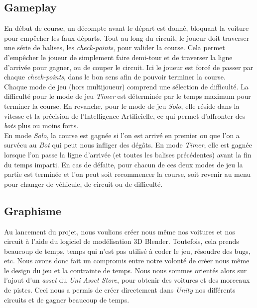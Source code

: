 \documentclass[12pt,a4paper]{article}
\newcommand{\AI}{Intelligence Artificielle}
\begin{document}
        \subsection{Gameplay}
            En début de course, un décompte avant le départ est donné, bloquant la voiture pour
            empêcher les faux départs. Tout au long du circuit, le joueur doit traverser une série de 
            balises, les \textsl{check-points}, pour valider la course. Cela permet d'empêcher le 
            joueur de simplement faire demi-tour et de traverser la ligne d'arrivée pour gagner, ou
            de couper le circuit. Ici le joueur est forcé de passer par chaque \textsl{check-points},
            dans le bon sens afin de pouvoir terminer la course.\\
            Chaque mode de jeu (hors multijoueur) comprend une sélection de difficulté.
            La difficulté pour le mode de jeu \textsl{Timer} est déterminée par le temps maximum pour 
            terminer la course. En revanche, pour le mode de jeu \textsl{Solo}, 
            elle réside dans la vitesse et la précision de l'\AI, ce qui permet d'affronter des 
            \textsl{bots} plus
            ou moins forts. \\
            En mode \textsl{Solo}, la course est gagnée si l'on est arrivé en premier ou que l'on a 
            survécu au \textsl{Bot} qui peut nous infliger des dégâts. En mode \textsl{Timer}, elle 
            est gagnée lorsque l'on passe la ligne d'arrivée (et toutes les balises précédentes) avant
            la fin du temps imparti. En cas de défaite, pour chacun de ces deux modes de jeu la partie
            est terminée et l'on peut soit recommencer la course, soit revenir au menu pour changer de
            véhicule, de circuit ou de difficulté.\\
            
            
            \subsection{Graphisme}
                Au lancement du projet, nous voulions créer nous même nos voitures et nos circuit à 
                l'aide du logiciel de modélisation 3D Blender. Toutefois, cela prends beaucoup de temps,
                temps qui n'est pas utilisé à coder le jeu, résoudre des bugs, etc. Nous avons donc fait
                un compromis entre notre volonté de créer nous même le design du jeu et la contrainte de
                temps. Nous nous sommes orientés alors sur l'ajout d'un \textsl{asset} du \textsl{Uni
                Asset Store}, pour obtenir des voitures et des morceaux de pistes. Ceci nous a permis de
                créer directement dans \textsl{Unity} nos différents circuits et de gagner beaucoup de 
                temps. 
            
\end{document}
